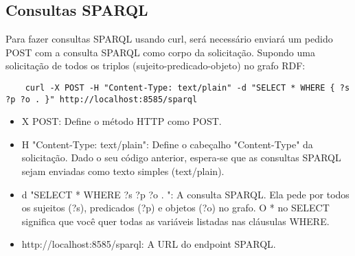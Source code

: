 \subsection{Consultas SPARQL}

Para fazer consultas SPARQL usando curl, será necessário enviará um pedido POST com a consulta SPARQL como corpo da solicitação. Supondo uma solicitação de todos os triplos (sujeito-predicado-objeto) no grafo RDF:

\begin{verbatim}
    curl -X POST -H "Content-Type: text/plain" -d "SELECT * WHERE { ?s ?p ?o . }" http://localhost:8585/sparql
\end{verbatim}

\begin{itemize}
    \item X POST: Define o método HTTP como POST.
    \item H "Content-Type: text/plain": Define o cabeçalho "Content-Type" da solicitação. Dado o seu código anterior, espera-se que as consultas SPARQL sejam enviadas como texto simples (text/plain).
    \item d "SELECT * WHERE { ?s ?p ?o . }": A consulta SPARQL. Ela pede por todos os sujeitos (?s), predicados (?p) e objetos (?o) no grafo. O * no SELECT significa que você quer todas as variáveis listadas nas cláusulas WHERE.
    \item http://localhost:8585/sparql: A URL do endpoint SPARQL.
\end{itemize}

